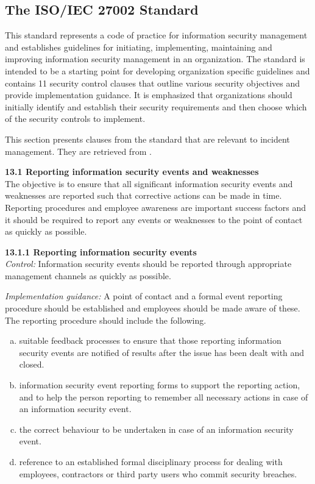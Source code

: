 \subsection{The \acs{ISO}/\acs{IEC} 27002 Standard}
\label{sec:iso27002}
This standard represents a code of practice for information security management and establishes guidelines for initiating, implementing, maintaining and improving information security management in an organization. The standard is intended to be a starting point for developing organization specific guidelines and contains 11 security control clauses that outline various security objectives and provide implementation guidance. It is emphasized that organizations should initially identify and establish their security requirements and then choose which of the security controls to implement.

This section presents clauses from the standard that are relevant to incident management. They are retrieved from \cite{ISO/IEC27002}.

\textbf{13.1 Reporting information security events and weaknesses } \\
The objective is to ensure that all significant information security events and weaknesses are reported such that corrective actions can be made in time. Reporting procedures and employee awareness are important success factors and it should be required to report any events or weaknesses to the point of contact as quickly as possible.

\textbf{13.1.1 Reporting information security events} \\
\emph{Control:} Information security events should be reported through appropriate management channels as quickly as possible.

\emph{Implementation guidance:} A point of contact and a formal event reporting procedure should be established and employees should be made aware of these. The reporting procedure should include the following.
\begin{enumerate}[a)]
\item suitable feedback processes to ensure that those reporting information security events are notified of results after the issue has been dealt with and closed.
\item information security event reporting forms to support the reporting action, and to help the person reporting to remember all necessary actions in case of an information security event.
\item the correct behaviour to be undertaken in case of an information security event.
\item reference to an established formal disciplinary process for dealing with employees, contractors or third party users who commit security breaches.
\end{enumerate}

